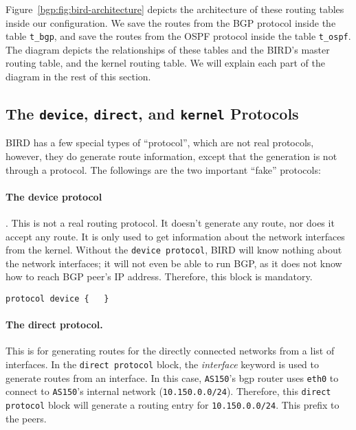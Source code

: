 Figure~\ref{bgp:fig:bird-architecture} depicts the architecture
of these routing tables inside our configuration. We save
the routes from the BGP protocol inside the table \texttt{t\_bgp}, and save
the routes from the OSPF protocol inside the table \texttt{t\_ospf}. 
The diagram depicts the relationships of these tables and 
the BIRD's master routing table, and the kernel routing table. 
We will explain each part of the diagram in the rest of this 
section. 

\subsection{The \texttt{device}, \texttt{direct}, and \texttt{kernel} Protocols} 

BIRD has a few special types of ``protocol'', which are not
real protocols, however, they do generate route information,
except that the generation is not through a protocol. 
The followings
are the two important ``fake'' protocols:

\paragraph{The device protocol}. This is not a real routing protocol. It doesn't
generate any route, nor does it accept any route. It is only used to get
information about the network interfaces from the kernel. Without the
\texttt{device protocol}, BIRD will know nothing about the network
interfaces; it will not even be able to run BGP, as it does not know how
to reach BGP peer's IP address. Therefore, this block is mandatory.

\begin{lstlisting}
protocol device {   }
\end{lstlisting}


\paragraph{The direct protocol.} 
This is for generating routes for the directly
connected networks from a list of interfaces. In the \texttt{direct protocol}
block, the \textit{interface} keyword is used to generate routes from an
interface. In this case, \texttt{AS150}'s bgp router uses \texttt{eth0} to
connect to \texttt{AS150}'s internal network (\texttt{10.150.0.0/24}).
Therefore, this \texttt{direct protocol} block will generate a routing
entry for \texttt{10.150.0.0/24}. This 
prefix to the peers.

